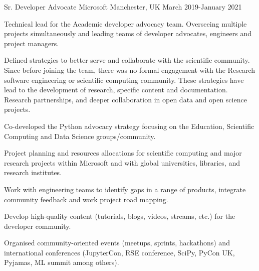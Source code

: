 


\begin{cventries}



\cventry
{Sr. Developer Advocate} %
{Microsoft} %
{Manchester, UK} %
{March 2019-January 2021 } %
{ %
\begin{cvitems}
\item {Technical lead for the Academic developer advocacy team. Overseeing multiple projects simultaneously and leading teams of developer advocates, engineers and project managers.}
\item {Defined strategies to better serve and collaborate with the scientific community. Since before joining the team, there was no formal engagement with the Research software engineering or scientific computing community. These strategies have lead to the development of research, specific content and documentation. Research partnerships, and deeper collaboration in open data and open science projects.}
\item {Co-developed the Python advocacy strategy focusing on the Education, Scientific Computing and Data Science groups/community.}
\item{Project planning and resources allocations for scientific computing and major research projects within Microsoft and with global universities, libraries, and research institutes. }
\item {Work with engineering teams to identify gaps in a range of products, integrate community feedback and work project road mapping.}
\item {Develop high-quality content (tutorials, blogs, videos, streams, etc.) for the developer community.}
\item {Organised community-oriented events (meetups, sprints, hackathons) and international conferences (JupyterCon, RSE conference, SciPy, PyCon UK, Pyjamas, ML summit among others).}
\end{cvitems}
}


\end{cventries}
